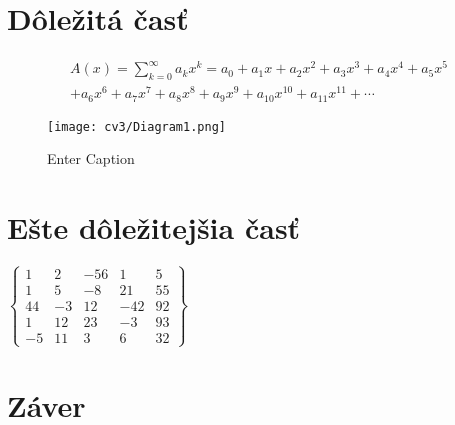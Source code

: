 \documentclass[10pt,twoside,twocolumn,slovak,a4paper,twocoloum]{article}
\begin{document}
\section{Dôležitá časť} \label{dolezita}

\begin{multline}
  A(x)=\sum_{k=0}^{\infty} a_k x^k
  = a_0 + a_1 x + a_2 x^2 + a_3 x^3 + a_4 x^4 + a_5 x^5 \\ 
  + a_6 x^6 + a_7 x^7 + a_8 x^8 + a_9 x^9 + a_{10} x^{10} + a_{11} x^{11}
  + \cdots
\end{multline}

\begin{figure}
    \centering
    \texttt{[image: cv3/Diagram1.png]}
    \caption{Enter Caption}
    \label{fig:placeholder}
\end{figure}

\section{Ešte dôležitejšia časť} \label{dolezitejsia}

$\begin{Bmatrix}
1 & 2 & -56 & 1 & 5\\
1 & 5 & -8 & 21 & 55\\
44 & -3 & 12 & -42 & 92\\
1 & 12 & 23 & -3 & 93\\
-5 & 11 & 3 & 6 & 32
\end{Bmatrix}$



\section{Záver} \label{zaver} %






\end{document}
